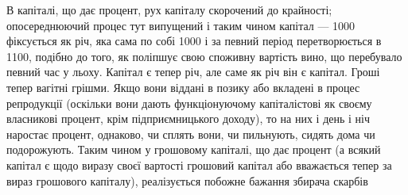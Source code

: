 В капіталі, що дає процент, рух капіталу скорочений до
крайності; опосереднюючий процес тут випущений і таким чином
капітал — 1000 фіксується як річ, яка сама по собі \deq{} 1000 і за певний
період перетворюється в 1100, подібно до того, як поліпшує
свою споживну вартість вино, що перебувало певний час у льоху.
Капітал є тепер річ, але саме як річ він є капітал. Гроші тепер
вагітні грішми. Якщо вони віддані в позику або вкладені в процес
репродукції (оскільки вони дають функціонуючому капіталістові
як своєму власникові процент, крім підприємницького доходу), то
на них і день і ніч наростає процент, однаково, чи сплять вони,
чи пильнують, сидять дома чи подорожують. Таким чином у
грошовому капіталі, що дає процент (а всякий капітал є щодо виразу
своєї вартості грошовий капітал або вважається тепер
за вираз грошового капіталу), реалізується побожне бажання збирача
скарбів
